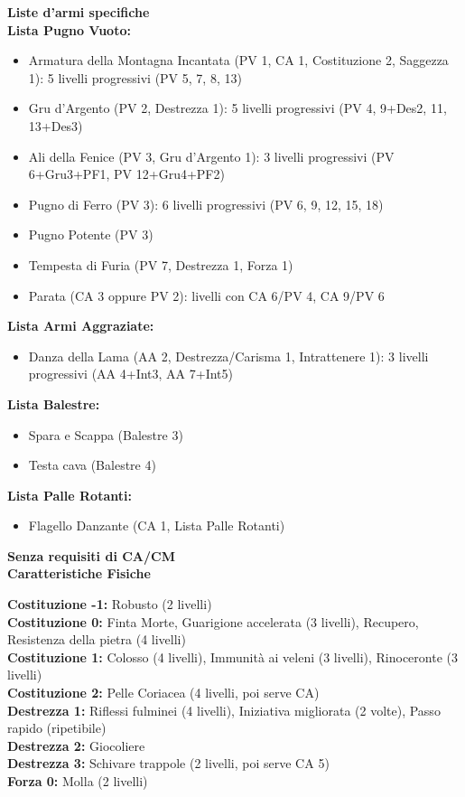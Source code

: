 \begin{multicols}{2}
\textbf{{\large Liste d'armi specifiche}}\\

	\textbf{Lista Pugno Vuoto:}
	\begin{itemize}
		\item Armatura della Montagna Incantata (PV 1, CA 1, Costituzione 2, Saggezza 1): 5 livelli progressivi (PV 5, 7, 8, 13)
		\item Gru d'Argento (PV 2, Destrezza 1): 5 livelli progressivi (PV 4, 9+Des2, 11, 13+Des3)
		\item Ali della Fenice (PV 3, Gru d'Argento 1): 3 livelli progressivi (PV 6+Gru3+PF1, PV 12+Gru4+PF2)
		\item Pugno di Ferro (PV 3): 6 livelli progressivi (PV 6, 9, 12, 15, 18)
		\item Pugno Potente (PV 3)
		\item Tempesta di Furia (PV 7, Destrezza 1, Forza 1)
		\item Parata (CA 3 oppure PV 2): livelli con CA 6/PV 4, CA 9/PV 6
	\end{itemize}

	\textbf{Lista Armi Aggraziate:}
	\begin{itemize}
		\item Danza della Lama (AA 2, Destrezza/Carisma 1, Intrattenere 1): 3 livelli progressivi (AA 4+Int3, AA 7+Int5)
	\end{itemize}

	\textbf{Lista Balestre:}
	\begin{itemize}
		\item Spara e Scappa (Balestre 3)
		\item Testa cava (Balestre 4)
	\end{itemize}

	\textbf{Lista Palle Rotanti:}
	\begin{itemize}
		\item Flagello Danzante (CA 1, Lista Palle Rotanti)
	\end{itemize}

	\textbf{{\large Senza requisiti di CA/CM}}\\

	\textbf{Caratteristiche Fisiche}

	\textbf{Costituzione -1:} Robusto (2 livelli)\\
	\textbf{Costituzione 0:} Finta Morte, Guarigione accelerata (3 livelli), Recupero, Resistenza della pietra (4 livelli)\\
	\textbf{Costituzione 1:} Colosso (4 livelli), Immunità ai veleni (3 livelli), Rinoceronte (3 livelli)\\
	\textbf{Costituzione 2:} Pelle Coriacea (4 livelli, poi serve CA)\\
	\textbf{Destrezza 1:} Riflessi fulminei (4 livelli), Iniziativa migliorata (2 volte), Passo rapido (ripetibile)\\
	\textbf{Destrezza 2:} Giocoliere\\
	\textbf{Destrezza 3:} Schivare trappole (2 livelli, poi serve CA 5)\\
	\textbf{Forza 0:} Molla (2 livelli)\\


\end{multicols}
